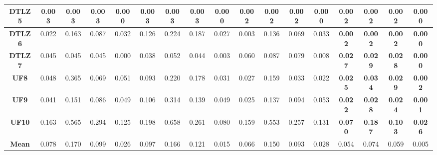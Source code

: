 \begin{table*}[t]
\begin{tabular}{cc|c|c|c|c|c|c|c|c|c|c|c|c|c|c|c}
\multicolumn{1}{c|}{\textbf{DTLZ5}} & 0.003        & 0.003        & 0.003         & 0.000        & 0.003        & 0.003        & 0.003         & 0.000        & 0.002          & 0.002          & 0.002          & 0.000          & \textbf{0.002} & \textbf{0.002} & \textbf{0.002} & \textbf{0.000} \\ \hline
\multicolumn{1}{c|}{\textbf{DTLZ6}} & 0.022        & 0.163        & 0.087         & 0.032        & 0.126        & 0.224        & 0.187         & 0.027        & 0.003          & 0.136          & 0.069          & 0.033          & \textbf{0.002} & \textbf{0.002} & \textbf{0.002} & \textbf{0.000} \\ \hline
\multicolumn{1}{c|}{\textbf{DTLZ7}} & 0.045        & 0.045        & 0.045         & 0.000        & 0.038        & 0.052        & 0.044         & 0.003        & 0.060          & 0.087          & 0.079          & 0.008          & \textbf{0.027} & \textbf{0.029} & \textbf{0.028} & \textbf{0.000} \\ \hline
\multicolumn{1}{c|}{\textbf{UF8}}   & 0.048        & 0.365        & 0.069         & 0.051        & 0.093        & 0.220        & 0.178         & 0.031        & 0.027          & 0.159          & 0.033          & 0.022          & \textbf{0.025} & \textbf{0.034} & \textbf{0.029} & \textbf{0.002} \\ \hline
\multicolumn{1}{c|}{\textbf{UF9}}   & 0.041        & 0.151        & 0.086         & 0.049        & 0.106        & 0.314        & 0.139         & 0.049        & 0.025          & 0.137          & 0.094          & 0.053          & \textbf{0.022} & \textbf{0.028} & \textbf{0.024} & \textbf{0.001} \\ \hline
\multicolumn{1}{c|}{\textbf{UF10}}  & 0.163        & 0.565        & 0.294         & 0.125        & 0.198        & 0.658        & 0.261         & 0.080        & 0.159          & 0.553          & 0.257          & 0.131          & \textbf{0.070} & \textbf{0.187} & \textbf{0.103} & \textbf{0.026} \\ \hline
\multicolumn{1}{c|}{\textbf{Mean}}  & 0.078        & 0.170        & 0.099         & 0.026        & 0.097        & 0.166        & 0.121         & 0.015        & 0.066          & 0.150          & 0.093          & 0.028          & 0.054          & 0.074          & 0.059          & 0.005          \\ \hline
\end{tabular}%
\end{table*}

